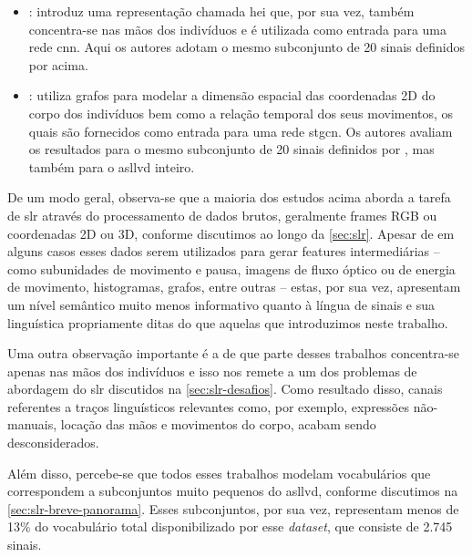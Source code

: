 \begin{itemize}
    \item \textbf{}: introduz uma representação chamada \acrfull{hei} que, por sua vez, também concentra-se nas mãos dos indivíduos e é utilizada como entrada para uma rede \acrfull{cnn}.
          Aqui os autores adotam o mesmo subconjunto de 20 sinais definidos por  acima.

    \item \textbf{}: utiliza grafos para modelar a dimensão espacial das coordenadas 2D do corpo dos indivíduos bem como a relação temporal dos seus movimentos, os quais são fornecidos como entrada para uma rede \acrfull{stgcn}.
          Os autores avaliam os resultados para o mesmo subconjunto de 20 sinais definidos por , mas também para o \acrshort{asllvd} inteiro.
\end{itemize}


De um modo geral, observa-se que a maioria dos estudos acima aborda a tarefa de \acrlong{slr} através do processamento de dados brutos, geralmente frames RGB ou coordenadas 2D ou 3D, conforme discutimos ao longo da \autoref{sec:slr}.
Apesar de em alguns casos esses dados serem utilizados para gerar features intermediárias -- como subunidades de movimento e pausa, imagens de fluxo óptico ou de energia de movimento, histogramas, grafos, entre outras -- estas, por sua vez, apresentam um nível semântico muito menos informativo quanto à língua de sinais e sua linguística propriamente ditas do que aquelas que introduzimos neste trabalho.

Uma outra observação importante é a de que parte desses trabalhos concentra-se apenas nas mãos dos indivíduos e isso nos remete a um dos problemas de abordagem do \acrshort{slr} discutidos na \autoref{sec:slr-desafios}. Como resultado disso, canais referentes a traços linguísticos relevantes como, por exemplo, expressões não-manuais, locação das mãos e movimentos do corpo, acabam sendo desconsiderados.

Além disso, percebe-se que todos esses trabalhos modelam vocabulários que correspondem a subconjuntos muito pequenos do \acrshort{asllvd}, conforme discutimos na \autoref{sec:slr-breve-panorama}.
Esses subconjuntos, por sua vez, representam menos de 13\% do vocabulário total disponibilizado por esse \textit{dataset}, que consiste de 2.745 sinais.

